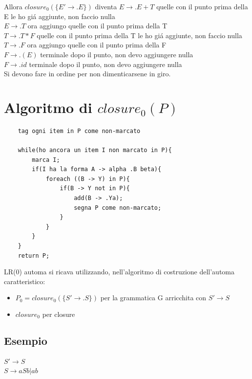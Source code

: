 Allora $closure_0(\{ E' \rightarrow .E \})$ diventa
$E \rightarrow .E + T $ quelle con il punto prima della E le ho gi\'a aggiunte, non faccio nulla\\
$E \rightarrow .T $ ora aggiungo quelle con il punto prima della T\\
$T \rightarrow .T * F $ quelle con il punto prima della T le ho gi\'a aggiunte, non faccio nulla\\
$T \rightarrow .F $ ora aggiungo quelle con il punto prima della F\\
$F \rightarrow .(E)$ terminale dopo il punto, non devo aggiungere nulla\\
$F \rightarrow .id$ terminale dopo il punto, non devo aggiungere nulla\\
Si devono fare in ordine per non dimenticarsene in giro.

\section{Algoritmo di $closure_0(P)$}
\begin{lstlisting}
	tag ogni item in P come non-marcato

	while(ho ancora un item I non marcato in P){
		marca I;
		if(I ha la forma A -> alpha .B beta){
			foreach ((B -> Y) in P){
				if(B -> Y not in P){
					add(B -> .Ya);
					segna P come non-marcato;
				}
			}
		}
	}
	return P;
\end{lstlisting}

LR(0) automa si ricava utilizzando, nell'algoritmo di costruzione dell'automa caratteristico:
\begin{itemize}
	\item $P_0 = closure_0 ( \{ S' \rightarrow .S \} )$ per la grammatica G arricchita con $S' \rightarrow S$\\
	\item $ closure_0 $ per closure\\
\end{itemize}

\subsection{Esempio}
$ S' \rightarrow S $\\
$ S \rightarrow aSb | ab $\\

